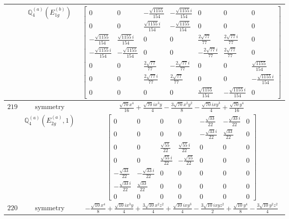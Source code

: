 \documentclass[fleqn,8pt,landscape]{jsarticle}
\begin{document}
\begin{longtable}{ccc}
$  $ & $ \mathbb{Q}_{4}^{(a)}(E_{1g}^{(b)}) $ & $ \begin{bmatrix} 0 & 0 & - \frac{\sqrt{1155}}{154} & - \frac{\sqrt{1155} i}{154} & 0 & 0 & 0 \\ 0 & 0 & \frac{\sqrt{1155} i}{154} & - \frac{\sqrt{1155}}{154} & 0 & 0 & 0 \\ - \frac{\sqrt{1155}}{154} & \frac{\sqrt{1155} i}{154} & 0 & 0 & \frac{2 \sqrt{77}}{77} & \frac{2 \sqrt{77} i}{77} & 0 \\ - \frac{\sqrt{1155} i}{154} & - \frac{\sqrt{1155}}{154} & 0 & 0 & - \frac{2 \sqrt{77} i}{77} & \frac{2 \sqrt{77}}{77} & 0 \\ 0 & 0 & \frac{2 \sqrt{77}}{77} & - \frac{2 \sqrt{77} i}{77} & 0 & 0 & \frac{\sqrt{1155}}{154} \\ 0 & 0 & \frac{2 \sqrt{77} i}{77} & \frac{2 \sqrt{77}}{77} & 0 & 0 & - \frac{\sqrt{1155} i}{154} \\ 0 & 0 & 0 & 0 & \frac{\sqrt{1155}}{154} & - \frac{\sqrt{1155} i}{154} & 0 \end{bmatrix} $ \\ \hline
$ 219 $ & $ \text{symmetry} $ & $ \frac{\sqrt{70} x^{4}}{16} + \frac{\sqrt{70} i x^{3} y}{4} - \frac{3 \sqrt{70} x^{2} y^{2}}{8} - \frac{\sqrt{70} i x y^{3}}{4} + \frac{\sqrt{70} y^{4}}{16} $ \\
$  $ & $ \mathbb{Q}_{4}^{(a)}(E_{2g}^{(a)},1) $ & $ \begin{bmatrix} 0 & 0 & 0 & 0 & - \frac{\sqrt{33}}{22} & - \frac{\sqrt{33} i}{22} & 0 \\ 0 & 0 & 0 & 0 & - \frac{\sqrt{33} i}{22} & \frac{\sqrt{33}}{22} & 0 \\ 0 & 0 & \frac{\sqrt{55}}{22} & \frac{\sqrt{55} i}{22} & 0 & 0 & 0 \\ 0 & 0 & \frac{\sqrt{55} i}{22} & - \frac{\sqrt{55}}{22} & 0 & 0 & 0 \\ - \frac{\sqrt{33}}{22} & - \frac{\sqrt{33} i}{22} & 0 & 0 & 0 & 0 & 0 \\ - \frac{\sqrt{33} i}{22} & \frac{\sqrt{33}}{22} & 0 & 0 & 0 & 0 & 0 \\ 0 & 0 & 0 & 0 & 0 & 0 & 0 \end{bmatrix} $ \\ \hline
$ 220 $ & $ \text{symmetry} $ & $ - \frac{\sqrt{10} x^{4}}{8} + \frac{\sqrt{10} i x^{3} y}{4} + \frac{3 \sqrt{10} x^{2} z^{2}}{4} + \frac{\sqrt{10} i x y^{3}}{4} - \frac{3 \sqrt{10} i x y z^{2}}{2} + \frac{\sqrt{10} y^{4}}{8} - \frac{3 \sqrt{10} y^{2} z^{2}}{4} $ \\

\end{longtable}
\end{document}
